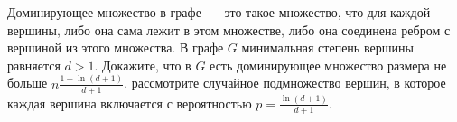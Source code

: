 Доминирующее множество в графе~--- это такое множество, что для каждой вершины, либо она сама лежит в
этом множестве, либо она соединена ребром с вершиной из этого множества. В графе $G$ минимальная степень
вершины равняется $d > 1$. Докажите, что в $G$ есть доминирующее множество размера не больше
$n \frac{1 + \ln(d + 1)}{d + 1}$.  рассмотрите случайное подмножество вершин, в
которое каждая вершина включается с вероятностью $p = \frac{\ln(d + 1)}{d + 1}$.
